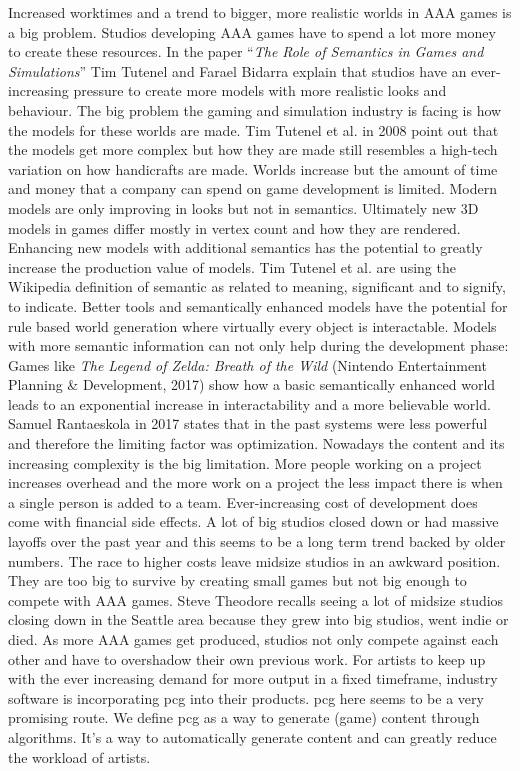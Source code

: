 \documentclass[10pt,a4paper]{article}
\begin{document}
\begin{multicols}{2}
Increased worktimes and a trend to bigger, more realistic worlds in AAA games is a big problem. Studios developing AAA games have to spend a lot more money to create these resources. In the paper “\textit{The Role of Semantics in Games and Simulations}” Tim Tutenel and Farael Bidarra explain that studios have an ever-increasing pressure to create more models with more realistic looks and behaviour. The big problem the gaming and simulation industry is facing is how the models for these worlds are made. Tim Tutenel et al. in 2008 point out that the models get more complex but how they are made still resembles a high-tech variation on how handicrafts are made\cite{Tutenel2008}. Worlds increase but the amount of time and money that a company can spend on game development is limited. Modern models are only improving in looks but not in semantics\cite{Tutenel2008}. Ultimately new 3D models in games differ mostly in vertex count and how they are rendered. Enhancing new models with additional semantics has the potential to greatly increase the production value of models. Tim Tutenel et al. are using the Wikipedia definition of semantic as related to meaning, significant and to signify, to indicate\cite{Wikipediacontributors2019, Tutenel2008}. Better tools and semantically enhanced models have the potential for rule based world generation where virtually every object is interactable. Models with more semantic information can not only help during the development phase: Games like \textit{The Legend of Zelda: Breath of the Wild} (Nintendo Entertainment Planning \& Development, 2017) show how a basic semantically enhanced world leads to an exponential increase in interactability and a more believable world. Samuel Rantaeskola in 2017 states that in the past systems were less powerful and therefore the limiting factor was optimization. Nowadays the content and its increasing complexity is the big limitation\cite{Prinke2017}. More people working on a project increases overhead and the more work on a project the less impact there is when a single person is added to a team.
Ever-increasing cost of development does come with financial side effects. A lot of big studios closed down or had massive layoffs over the past year \cite{Lahti2018, Schreier2019, Walker2019, Schreier2019a} and this seems to be a long term trend backed by older numbers\cite{Plunkett2012}. The race to higher costs leave midsize studios in an awkward position. They are too big to survive by creating small games but not big enough to compete with AAA games. Steve Theodore recalls seeing a lot of midsize studios closing down in the Seattle area because they grew into big studios, went indie or died\cite{Prinke2017}. As more AAA games get produced, studios not only compete against each other and have to overshadow their own previous work. For artists to keep up with the ever increasing demand for more output in a fixed timeframe, industry software is incorporating \gls{pcg} into their products. \gls{pcg} here seems to be a very promising route. We define \gls{pcg} as a way to generate (game) content through algorithms. It’s a way to automatically generate content and can greatly reduce the workload of artists.
\end{multicols}
\end{document}
